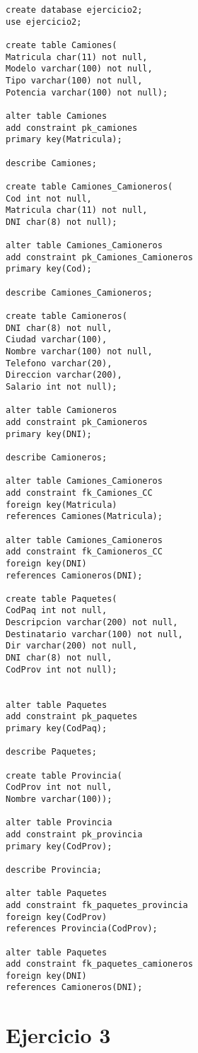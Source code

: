 \documentclass[a4paper,12pt]{article}
\begin{document}
\begin{lstlisting}
create database ejercicio2;
use ejercicio2;

create table Camiones(
Matricula char(11) not null,
Modelo varchar(100) not null,
Tipo varchar(100) not null,
Potencia varchar(100) not null);

alter table Camiones
add constraint pk_camiones
primary key(Matricula);

describe Camiones;

create table Camiones_Camioneros(
Cod int not null,
Matricula char(11) not null,
DNI char(8) not null);

alter table Camiones_Camioneros
add constraint pk_Camiones_Camioneros
primary key(Cod);

describe Camiones_Camioneros;

create table Camioneros(
DNI char(8) not null,
Ciudad varchar(100),
Nombre varchar(100) not null,
Telefono varchar(20),
Direccion varchar(200),
Salario int not null);

alter table Camioneros
add constraint pk_Camioneros
primary key(DNI);

describe Camioneros;

alter table Camiones_Camioneros
add constraint fk_Camiones_CC
foreign key(Matricula)
references Camiones(Matricula);

alter table Camiones_Camioneros
add constraint fk_Camioneros_CC
foreign key(DNI) 
references Camioneros(DNI);

create table Paquetes(
CodPaq int not null,
Descripcion varchar(200) not null,
Destinatario varchar(100) not null,
Dir varchar(200) not null,
DNI char(8) not null,
CodProv int not null);


alter table Paquetes
add constraint pk_paquetes
primary key(CodPaq);

describe Paquetes;

create table Provincia(
CodProv int not null,
Nombre varchar(100));

alter table Provincia
add constraint pk_provincia
primary key(CodProv);

describe Provincia;

alter table Paquetes
add constraint fk_paquetes_provincia
foreign key(CodProv)
references Provincia(CodProv);

alter table Paquetes
add constraint fk_paquetes_camioneros
foreign key(DNI)
references Camioneros(DNI);
\end{lstlisting}

\section{Ejercicio 3}
\end{document}
